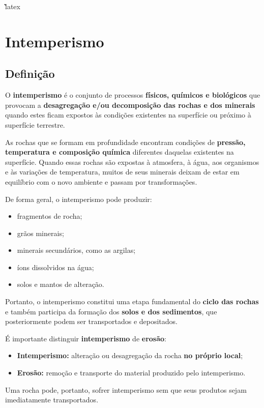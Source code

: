 \documentclass[a4paper,12pt]{article}
\theoremstyle{definition}
\theoremstyle{definition}
\theoremstyle{definition}
\begin{document}
\`\`\`latex
\section{Intemperismo}

\subsection{Definição}

O \textbf{intemperismo} é o conjunto de processos \textbf{físicos, químicos e biológicos} que provocam a \textbf{desagregação e/ou decomposição das rochas e dos minerais} quando estes ficam expostos às condições existentes na superfície ou próximo à superfície terrestre.

As rochas que se formam em profundidade encontram condições de \textbf{pressão, temperatura e composição química} diferentes daquelas existentes na superfície. Quando essas rochas são expostas à atmosfera, à água, aos organismos e às variações de temperatura, muitos de seus minerais deixam de estar em equilíbrio com o novo ambiente e passam por transformações.

De forma geral, o intemperismo pode produzir:

\begin{itemize}
    \item fragmentos de rocha;
    \item grãos minerais;
    \item minerais secundários, como as argilas;
    \item íons dissolvidos na água;
    \item solos e mantos de alteração.
\end{itemize}

Portanto, o intemperismo constitui uma etapa fundamental do \textbf{ciclo das rochas} e também participa da formação dos \textbf{solos e dos sedimentos}, que posteriormente podem ser transportados e depositados.

É importante distinguir \textbf{intemperismo} de \textbf{erosão}:

\begin{itemize}
    \item \textbf{Intemperismo:} alteração ou desagregação da rocha \textbf{no próprio local};
    \item \textbf{Erosão:} remoção e transporte do material produzido pelo intemperismo.
\end{itemize}

Uma rocha pode, portanto, sofrer intemperismo sem que seus produtos sejam imediatamente transportados.
\end{document}
